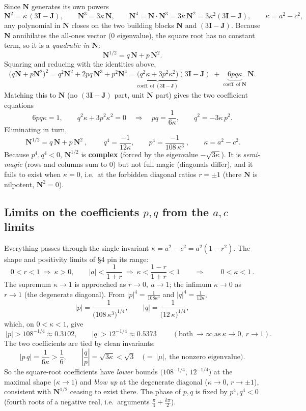 \documentclass[11pt]{article}
\newcommand{\N}{\mathbf{N}}
\newcommand{\JJ}{\mathbf{J}}
\newcommand{\I}{\mathbf{I}}
\begin{document}
Since $\N$ generates its own powers
\[
\N^2=\kappa\,(3\I-\JJ),\qquad \N^3=3\kappa\,\N,\qquad
\N^4=\N\cdot\N^3=3\kappa\,\N^2=3\kappa^2(3\I-\JJ),\qquad \kappa=a^2-c^2,
\]
any polynomial in $\N$ closes on the two building blocks $\N$ and $(3\I-\JJ)$.
Because $\N$ annihilates the all-ones vector ($0$ eigenvalue), the square root has
no constant term, so it is a \emph{quadratic in $\N$}:
\[
\N^{1/2}=q\,\N+p\,\N^2 .
\]
Squaring and reducing with the identities above,
\[
\bigl(q\N+p\N^2\bigr)^2
= q^2\N^2+2pq\,\N^3+p^2\N^4
= \underbrace{\bigl(q^2\kappa+3p^2\kappa^2\bigr)}_{\text{coeff. of }(3\I-\JJ)}(3\I-\JJ)
\;+\;\underbrace{6pq\kappa}_{\text{coeff. of }\N}\,\N .
\]
Matching this to $\N$ (no $(3\I-\JJ)$ part, unit $\N$ part) gives the two
coefficient equations
\[
6pq\kappa=1,\qquad q^2\kappa+3p^2\kappa^2=0
\quad\Longrightarrow\quad
pq=\frac{1}{6\kappa},\qquad q^2=-3\kappa\,p^2 .
\]
Eliminating in turn,
\[
\boxed{\ \N^{1/2}=q\,\N+p\,\N^2\ },\qquad
\boxed{\ q^4=\frac{-1}{12\kappa},\qquad p^4=\frac{-1}{108\,\kappa^3}\ },
\qquad \kappa=a^2-c^2 .
\]
Because $p^4,q^4<0$, $\N^{1/2}$ is \textbf{complex} (forced by the eigenvalue
$-\sqrt{3\kappa}$). It is \emph{semi-magic} (rows and columns sum to $0$) but not
full magic (diagonals differ), and it fails to exist when $\kappa=0$, i.e.\ at the
forbidden diagonal ratios $r=\pm1$ (there $\N$ is nilpotent, $\N^2=0$).

\subsection*{Limits on the coefficients $p,q$ from the $a,c$ limits}

Everything passes through the single invariant $\kappa=a^2-c^2=a^2(1-r^2)$. The
shape and positivity limits of \S4 pin its range:
\[
0<r<1\ \Rightarrow\ \kappa>0,\qquad
|a|<\frac{1}{1+r}\ \Rightarrow\ \kappa<\frac{1-r}{1+r}<1
\qquad\Longrightarrow\qquad
\boxed{\,0<\kappa<1\,}.
\]
The supremum $\kappa\to1$ is approached as $r\to0,\ a\to1$; the infimum
$\kappa\to0$ as $r\to1$ (the degenerate diagonal). From
$|p|^4=\tfrac{1}{108\kappa^3}$ and $|q|^4=\tfrac{1}{12\kappa}$,
\[
|p|=\frac{1}{\bigl(108\,\kappa^3\bigr)^{1/4}},\qquad
|q|=\frac{1}{\bigl(12\,\kappa\bigr)^{1/4}},
\]
which, on $0<\kappa<1$, give
\[
\boxed{\ |p|>108^{-1/4}\approx0.3102,\qquad |q|>12^{-1/4}\approx0.5373\ }
\qquad(\text{both}\ \to\infty\ \text{as}\ \kappa\to0,\ r\to1).
\]
The two coefficients are tied by clean invariants:
\[
|p\,q|=\frac{1}{6\kappa}>\frac16,\qquad
\left|\frac{q}{p}\right|=\sqrt{3\kappa}<\sqrt3
\quad\bigl(=\ |\mu|,\ \text{the nonzero eigenvalue}\bigr).
\]
So the square-root coefficients have \emph{lower} bounds $\bigl(108^{-1/4},\,
12^{-1/4}\bigr)$ at the maximal shape ($\kappa\to1$) and \emph{blow up} at the
degenerate diagonal ($\kappa\to0$, $r\to\pm1$), consistent with $\N^{1/2}$ ceasing
to exist there. The phase of $p,q$ is fixed by $p^4,q^4<0$ (fourth roots of a
negative real, i.e.\ arguments $\tfrac{\pi}{4}+\tfrac{k\pi}{2}$).
\end{document}

